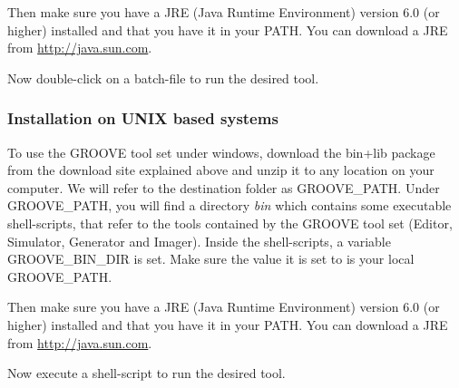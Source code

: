 Then make sure you have a JRE (Java Runtime Environment) version 6.0 (or
higher) installed and that you have it in your PATH. You can download a JRE
from \url{http://java.sun.com}.

Now double-click on a batch-file to run the desired tool.

\subsubsection{Installation on UNIX based systems}

To use the GROOVE tool set under windows, download the bin+lib package from the
download site explained above and unzip it to any location on your computer. We
will refer to the destination folder as GROOVE\_PATH. Under GROOVE\_PATH, you
will find a directory \emph{bin} which contains some executable shell-scripts,
that refer to the tools contained by the GROOVE tool set (Editor, Simulator,
Generator and Imager). Inside the shell-scripts, a variable GROOVE\_BIN\_DIR is
set. Make sure the value it is set to is your local GROOVE\_PATH.

Then make sure you have a JRE (Java Runtime Environment) version 6.0 (or
higher) installed and that you have it in your PATH. You can download a JRE
from \url{http://java.sun.com}.

Now execute a shell-script to run the desired tool.

